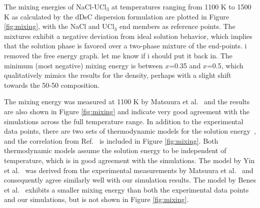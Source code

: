 \documentclass[preprint,3p,10pt,onecolumn,number,sort&compress]{elsarticle}
\begin{document}
The mixing energies of NaCl-UCl$_3$ at temperatures ranging from 1100 K to 1500 K as calculated by the dDsC dispersion formulation are plotted in Figure \ref{fig:mixing}, with the NaCl and UCl$_3$ end members as reference points. The mixtures exhibit a negative deviation from ideal solution behavior, which implies that the solution phase is favored over a two-phase mixture of the end-points. 
{\color{red} i removed the free energy graph. let me know if i should put it back in.}
 The minimum (most negative) mixing energy is between $x$=0.35 and $x$=0.5, which qualitatively mimics the results for the density, perhaps with a slight shift towards the 50-50 composition. %
 
 The mixing energy was measured at 1100 K by Matsuura et al.~\cite{Matsuura} and the results are also shown in Figure \ref{fig:mixing} and indicate very good agreement with the simulations across the full temperature range. In addition to the experimental data points, there are two sets of thermodynamic models for the solution energy~\cite{BENES2008,YIN2020}, and the correlation from Ref.~\cite{YIN2020} is included in Figure \ref{fig:mixing}. Both thermodynamic models assume the solution energy to be independent of temperature, which is in good agreement with the simulations. The model by Yin et al.~\cite{YIN2020} was derived from the experimental measurements by Matsuura et al.~\cite{Matsuura} and consequently agree similarly well with our simulation results. The model by Benes et al.~\cite{BENES2008} exhibits a smaller mixing energy than both the experimental data points and our simulations, but is not shown in Figure \ref{fig:mixing}. 

\end{document}

